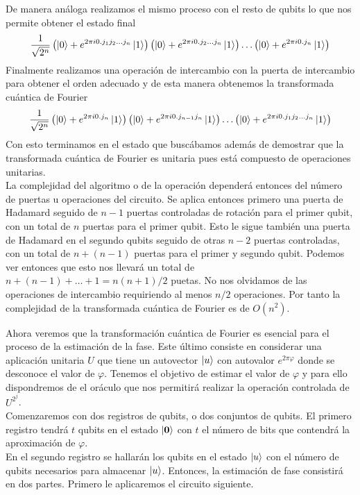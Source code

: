 \documentclass[a4paper]{article}
\numberwithin{equation}{section}
\begin{document}
De manera análoga realizamos el mismo proceso con el resto de qubits lo que nos permite obtener el estado final
\begin{equation}
\frac{1}{\sqrt{2^n}}
\left( \ket{0} + e^{2\pi i 0.j_1 j_2\ldots j_n}\ket{1} \right)
\left( \ket{0} + e^{2\pi i 0.j_2\ldots j_n}\ket{1} \right)
\ldots
\left( \ket{0} + e^{2\pi i 0.j_n}\ket{1} \right)
\end{equation}
Finalmente realizamos una operación de intercambio con la puerta de intercambio para obtener el orden adecuado y de esta manera obtenemos la transformada cuántica de Fourier
\begin{equation}
\frac{1}{\sqrt{2^n}}
\left( \ket{0} + e^{2\pi i 0.j_n}\ket{1} \right)
\left( \ket{0} + e^{2\pi i 0.j_{n-1} j_n}\ket{1} \right)
\ldots
\left( \ket{0} + e^{2\pi i 0.j_1 j_2\ldots j_n}\ket{1} \right)
\end{equation}
Con esto terminamos en el estado que buscábamos además de demostrar que la transformada cuántica de Fourier es unitaria pues está compuesto de operaciones unitarias.\\
\linebreak
La complejidad del algoritmo o de la operación dependerá entonces del número de puertas u operaciones del circuito. Se aplica entonces primero una puerta de Hadamard seguido de $n-1$ puertas controladas de rotación para el primer qubit, con un total de $n$ puertas para el primer qubit. Esto le sigue también una puerta de Hadamard en el segundo qubits seguido de otras $n-2$ puertas controladas, con un total de $n + (n-1)$ puertas para el primer y segundo qubit. Podemos ver entonces que esto nos llevará un total de $n +(n-1) + \ldots +1 = n(n+1)/2$ puetas. No nos olvidamos de las operaciones de intercambio requiriendo al menos $n/2$ operaciones. Por tanto la complejidad de la transformada cuántica de Fourier es de $O(n^2)$.

Ahora veremos que la transformación cuántica de Fourier es esencial para el proceso de la estimación de la fase. Este último consiste en considerar una aplicación unitaria $U$ que tiene un autovector $\ket{u}$ con autovalor $e^{2\pi \varphi}$ donde se desconoce el valor de $\varphi$. Tenemos el objetivo de estimar el valor de $\varphi$ y para ello dispondremos de el oráculo que nos permitirá realizar la operación controlada de $U^{2^j}$.\\
Comenzaremos con dos registros de qubits, o dos conjuntos de qubits. El primero registro tendrá $t$ qubits en el estado $\ket{\mathbf{0}}$ con $t$ el número de bits que contendrá la aproximación de $\varphi$.\\
En el segundo registro se hallarán los qubits en el estado $\ket{u}$ con el número de qubits necesarios para almacenar $\ket{u}$. Entonces, la estimación de fase consistirá en dos partes. Primero le aplicaremos el circuito siguiente.
\end{document}
